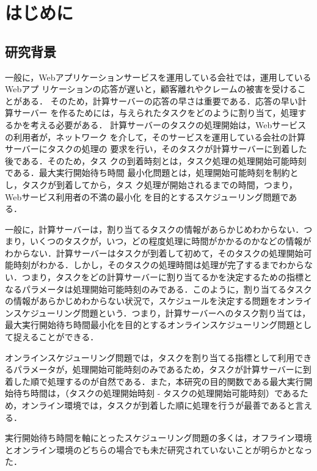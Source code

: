 \documentclass[12pt]{optlab-bachelor}
\begin{document}
\frontmatter

\chapter{はじめに}\label{c_1}
\section{研究背景}
一般に，Webアプリケーションサービスを運用している会社では，運用しているWebアプ
リケーションの応答が遅いと，顧客離れやクレームの被害を受けることがある．
そのため，計算サーバーの応答の早さは重要である．応答の早い計算サーバー
を作るためには，与えられたタスクをどのように割り当て，処理するかを考える必要がある．
計算サーバーのタスクの処理開始は，Webサービスの利用者が，ネットワーク
を介して，そのサービスを運用している会社の計算サーバーにタスクの処理の
要求を行い，そのタスクが計算サーバーに到着した後である．そのため，タス
クの到着時刻とは，タスク処理の処理開始可能時刻である．最大実行開始待ち時間
最小化問題とは，処理開始可能時刻を制約とし，タスクが到着してから，タス
ク処理が開始されるまでの時間，つまり，Webサービス利用者の不満の最小化
を目的とするスケジューリング問題である．

一般に，計算サーバーは，割り当てるタスクの情報があらかじめわからない．つまり，いくつのタスクが，いつ，どの程度処理に時間がかかるのかなどの情報がわからない．計算サーバーはタスクが到着して初めて，そのタスクの処理開始可能時刻がわかる．しかし，そのタスクの処理時間は処理が完了するまでわからない．つまり，タスクをどの計算サーバーに割り当てるかを決定するための指標となるパラメータは処理開始可能時刻のみである．このように，割り当てるタスクの情報があらかじめわからない状況で，スケジュールを決定する問題をオンラインスケジューリング問題という．つまり，計算サーバーへのタスク割り当ては，最大実行開始待ち時間最小化を目的とするオンラインスケジューリング問題として捉えることができる．

オンラインスケジューリング問題では，タスクを割り当てる指標として利用できるパラメータが，処理開始可能時刻のみであるため，タスクが計算サーバーに到着した順で処理するのが自然である．また，本研究の目的関数である最大実行開始待ち時間は，（タスクの処理開始時刻 - タスクの処理開始可能時刻）であるため，オンライン環境では，タスクが到着した順に処理を行うが最善であると言える．

実行開始待ち時間を軸にとったスケジューリング問題の多くは，オフライン環境とオンライン環境のどちらの場合でも未だ研究されていないことが明らかとなった．
\end{document}
